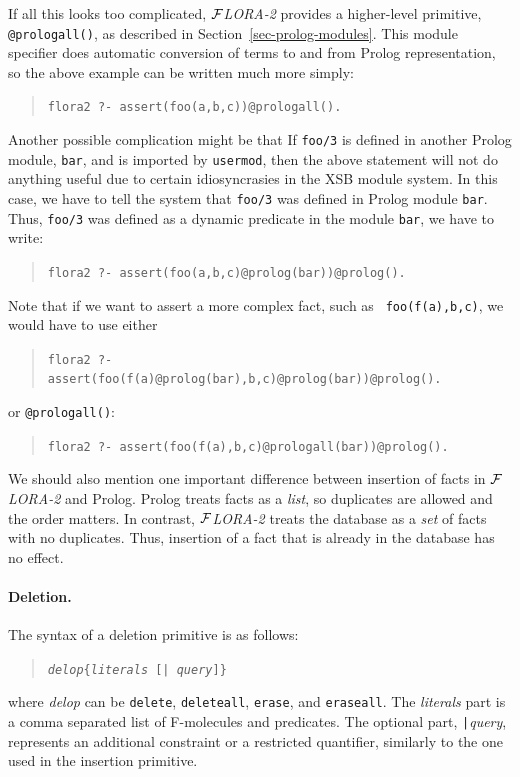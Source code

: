 \documentclass[11pt]{article}
\newcommand{\FLORA}{{\mbox{${\cal F}${\small\it LORA}\rm\emph{-2}}}\xspace}
\begin{document}
If all this looks too complicated, \FLORA provides a higher-level
primitive, {\tt @prologall()}, as described in
Section~\ref{sec-prolog-modules}. This module specifier does automatic
conversion of terms to and from Prolog representation, so the above example
can be written much more simply:
\begin{quote}
 {\tt flora2 ?- assert(foo(a,b,c))@prologall().  }  
\end{quote}

Another possible complication might be that
If {\tt foo/3} is defined in another Prolog module, {\tt bar}, and
is imported by {\tt usermod}, then the above statement will not do anything
useful due to certain idiosyncrasies in the XSB module system. In this
case, we have to tell the system that {\tt foo/3} was defined in Prolog
module {\tt bar}.  Thus,
{\tt foo/3} was defined as a dynamic predicate in the module
  {\tt bar}, we have to write:
\begin{quote}
 {\tt flora2 ?- assert(foo(a,b,c)@prolog(bar))@prolog().  }  
\end{quote}
Note that if we want to assert a more complex fact, such as {\tt
  foo(f(a),b,c)}, we would have to use either
\begin{quote}
 {\tt flora2 ?- assert(foo(f(a)@prolog(bar),b,c)@prolog(bar))@prolog().  }  
\end{quote}
or {\tt @prologall()}:
\begin{quote}
 {\tt flora2 ?- assert(foo(f(a),b,c)@prologall(bar))@prolog().  }  
\end{quote}

We should also mention one important difference between insertion of facts
in \FLORA and Prolog. Prolog treats facts as a \emph{list}, so duplicates
are allowed and the order matters. In contrast, \FLORA treats the database
as a \emph{set} of facts with no duplicates. Thus, insertion of a fact that
is already in the database has no effect.


%
\paragraph{Deletion.} The syntax of a deletion primitive is as follows:
\begin{quote}
{\tt \emph{delop}\{\emph{literals} [| \emph{query}]\}}
\end{quote}
where {\it delop} can be {\tt delete}, {\tt deleteall}, {\tt erase}, and
{\tt eraseall}. The {\it literals} part is a comma separated list of
F-molecules and predicates. The optional part, {\tt |}\emph{query},
represents an additional constraint or a restricted quantifier, similarly
to the one used in the insertion primitive.
\end{document}
